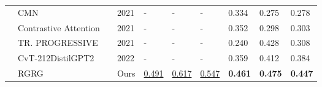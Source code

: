 \documentclass[10pt,twocolumn,letterpaper]{article}
\newcommand*{\MySmallestIndent}{\hspace*{-0.1cm}}
\newcommand*{\MySmallestIndentRight}{\hspace*{0.1cm}}
\begin{document}
\begin{table*}[t!]
{\begin{tabular}{lllllll||lll}
			                           & \cellcolor{Gray} CMN \cite{chen2021cross}                                                        & \cellcolor{Gray}\MySmallestIndentRight\xmark  & \MySmallestIndent \cellcolor{Gray} 2021 & \MySmallestIndent\cellcolor{Gray} -                 & \MySmallestIndent\cellcolor{Gray} -                 & \MySmallestIndent\cellcolor{Gray} -                 & \cellcolor{Gray}0.334          & \cellcolor{Gray}0.275          & \cellcolor{Gray}0.278          \\
			                           & \cellcolor{Gray} Contrastive Attention \cite{liu2021contrastive}                                 & \cellcolor{Gray}\MySmallestIndentRight\xmark  & \MySmallestIndent \cellcolor{Gray} 2021 & \MySmallestIndent\cellcolor{Gray} -                 & \MySmallestIndent\cellcolor{Gray} -                 & \MySmallestIndent\cellcolor{Gray} -                 & \cellcolor{Gray}0.352          & \cellcolor{Gray}0.298          & \cellcolor{Gray}0.303          \\
			                           & \cellcolor{Gray}  TR. PROGRESSIVE \cite{nooralahzadeh2021progressive}           & \cellcolor{Gray}\MySmallestIndentRight\xmark  & \MySmallestIndent \cellcolor{Gray} 2021 & \MySmallestIndent\cellcolor{Gray} -                 & \MySmallestIndent\cellcolor{Gray} -                 & \MySmallestIndent\cellcolor{Gray} -                 & \cellcolor{Gray}0.240          & \cellcolor{Gray}0.428          & \cellcolor{Gray}0.308          \\
			                           & \cellcolor{Gray} CvT-21{\large 2}DistilGPT2 \cite{nicolson2022improving}                         & \cellcolor{Gray}\MySmallestIndentRight\xmark  & \MySmallestIndent \cellcolor{Gray} 2022 & \MySmallestIndent\cellcolor{Gray} -                 & \MySmallestIndent\cellcolor{Gray} -                 & \MySmallestIndent\cellcolor{Gray} -                 & \cellcolor{Gray}0.359          & \cellcolor{Gray}0.412          & \cellcolor{Gray}0.384          \\
			\hhline{~|*9{-}|}
			                           & \cellcolor{Gray}RGRG                                                                             & \cellcolor{Gray}\MySmallestIndentRight\xmark  & \MySmallestIndent\cellcolor{Gray} Ours  & \MySmallestIndent\cellcolor{Gray} \underline{0.491} & \MySmallestIndent\cellcolor{Gray} \underline{0.617} & \MySmallestIndent\cellcolor{Gray} \underline{0.547} & \cellcolor{Gray}\textbf{0.461} & \cellcolor{Gray}\textbf{0.475} & \cellcolor{Gray}\textbf{0.447} \\ \hline

\end{tabular}}
\end{table*}
\end{document}
